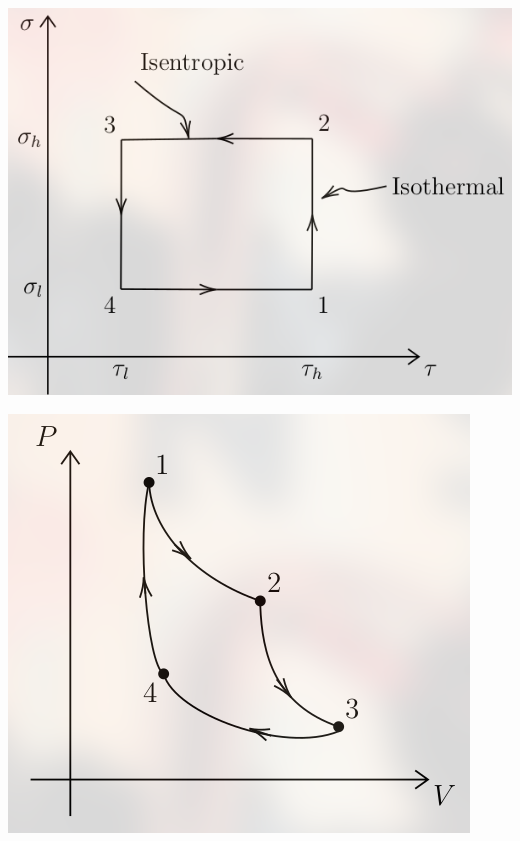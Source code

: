\documentclass[12pt]{article}
\begin{document}
\vspace{10pt}

\begin{multicols}{2}

  \centering

    \includegraphics[width=.35\textwidth]{Figures/CCycle.png}

    \includegraphics[width=.35\textwidth]{Figures/IdealCCycle.png}

\end{multicols}
\end{document}
